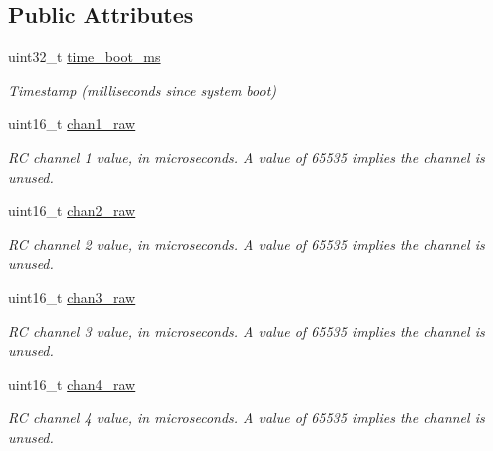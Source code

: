 \subsection*{Public Attributes}
\begin{DoxyCompactItemize}
\item 
\hypertarget{struct____mavlink__rc__channels__raw__t_aceced8c76bb7171ce4f03c0b633f7a5f}{uint32\+\_\+t \hyperlink{struct____mavlink__rc__channels__raw__t_aceced8c76bb7171ce4f03c0b633f7a5f}{time\+\_\+boot\+\_\+ms}}\label{struct____mavlink__rc__channels__raw__t_aceced8c76bb7171ce4f03c0b633f7a5f}

\begin{DoxyCompactList}\small\item\em Timestamp (milliseconds since system boot) \end{DoxyCompactList}\item 
uint16\+\_\+t \hyperlink{struct____mavlink__rc__channels__raw__t_a61bd698c061cfaa1da0b02d3ee390f4e}{chan1\+\_\+raw}
\begin{DoxyCompactList}\small\item\em R\+C channel 1 value, in microseconds. A value of 65535 implies the channel is unused. \end{DoxyCompactList}\item 
uint16\+\_\+t \hyperlink{struct____mavlink__rc__channels__raw__t_a87484f764dc99860781a6a29a07f9a7a}{chan2\+\_\+raw}
\begin{DoxyCompactList}\small\item\em R\+C channel 2 value, in microseconds. A value of 65535 implies the channel is unused. \end{DoxyCompactList}\item 
uint16\+\_\+t \hyperlink{struct____mavlink__rc__channels__raw__t_af56e588a0dcc66fbf2fdb61b5995060c}{chan3\+\_\+raw}
\begin{DoxyCompactList}\small\item\em R\+C channel 3 value, in microseconds. A value of 65535 implies the channel is unused. \end{DoxyCompactList}\item 
uint16\+\_\+t \hyperlink{struct____mavlink__rc__channels__raw__t_a5c7b02424976def78bae64edb08b4c60}{chan4\+\_\+raw}
\begin{DoxyCompactList}\small\item\em R\+C channel 4 value, in microseconds. A value of 65535 implies the channel is unused. \end{DoxyCompactList}\item 

\end{DoxyCompactItemize}
